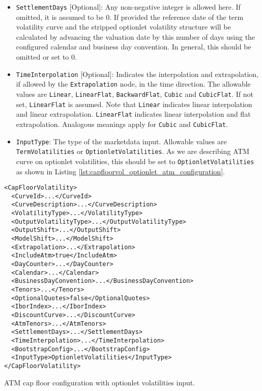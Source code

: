 \begin{itemize}
\item \lstinline!SettlementDays! [Optional]:
Any non-negative integer is allowed here. If omitted, it is assumed to be 0. If provided the reference date of the term volatility curve and the stripped optionlet volatility structure will be calculated by advancing the valuation date by this number of days using the configured calendar and business day convention. In general, this should be omitted or set to 0.

\item \lstinline!TimeInterpolation! [Optional]:
Indicates the interpolation and extrapolation, if allowed by the \lstinline!Extrapolation! node, in the time direction. The allowable values are \lstinline!Linear!, \lstinline!LinearFlat!, \lstinline!BackwardFlat!, \lstinline!Cubic! and \lstinline!CubicFlat!. If not set, \lstinline!LinearFlat! is assumed. Note that \lstinline!Linear! indicates linear interpolation and linear extrapolation. \lstinline!LinearFlat! indicates linear interpolation and flat extrapolation. Analogous meanings apply for \lstinline!Cubic! and \lstinline!CubicFlat!.

\item \lstinline!InputType!:
The type of the marketdata input. Allowable values are \lstinline!TermVolatilities! or \lstinline!OptionletVolatilities!. As we are describing ATM curve on optionlet volatilities, this should be set to \lstinline!OptionletVolatilities! as shown in Listing \ref{lst:capfloorvol_optionlet_atm_configuration}.

\end{itemize}

\begin{longlisting}
\begin{verbatim}
<CapFloorVolatility>
  <CurveId>...</CurveId>
  <CurveDescription>...</CurveDescription>
  <VolatilityType>...</VolatilityType>
  <OutputVolatilityType>...</OutputVolatilityType>
  <OutputShift>...</OutputShift>
  <ModelShift>...</ModelShift>
  <Extrapolation>...</Extrapolation>
  <IncludeAtm>true</IncludeAtm>
  <DayCounter>...</DayCounter>
  <Calendar>...</Calendar>
  <BusinessDayConvention>...</BusinessDayConvention>
  <Tenors>...</Tenors>
  <OptionalQuotes>false</OptionalQuotes>
  <IborIndex>...</IborIndex>
  <DiscountCurve>...</DiscountCurve>
  <AtmTenors>...</AtmTenors>
  <SettlementDays>...</SettlementDays>
  <TimeInterpolation>...</TimeInterpolation>
  <BootstrapConfig>...</BootstrapConfig>
  <InputType>OptionletVolatilities</InputType>
</CapFloorVolatility>
\end{verbatim}
\caption{ATM cap floor configuration with optionlet volatilities input.}
\label{lst:capfloorvol_optionlet_atm_configuration}
\end{longlisting}

